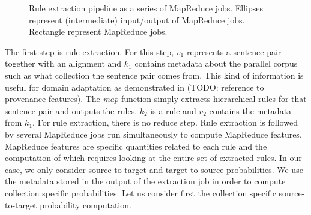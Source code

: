 \begin{figure}
\caption{Rule extraction pipeline as a series of MapReduce jobs. Ellipses
represent (intermediate) input/output of MapReduce jobs. Rectangle represent
MapReduce jobs.}
\label{fig:ruleXtractionPipeline}
\end{figure}
%
The first step is rule extraction. For
this step, $v_1$ represents a sentence pair together with an alignment and $k_1$
contains metadata about the parallel corpus such as what collection the sentence
pair comes from. This kind of information is useful for domain adaptation as
demonstrated in (TODO: reference to provenance features). The \emph{map}
function simply extracts hierarchical rules for
that sentence pair and outputs the rules. $k_2$ is a rule and $v_2$ contains
the metadata from $k_1$. For rule extraction, there is no reduce step.
Rule extraction is followed by several MapReduce jobs run simultaneously to
compute MapReduce features. MapReduce features are specific quantities related
to each rule and the computation of which requires looking at the entire set of
extracted rules. In our case, we only consider source-to-target and
target-to-source probabilities. We use the metadata stored in the output of the
extraction job in order to compute collection specific probabilities. Let us
consider first the collection specific source-to-target probability computation.
